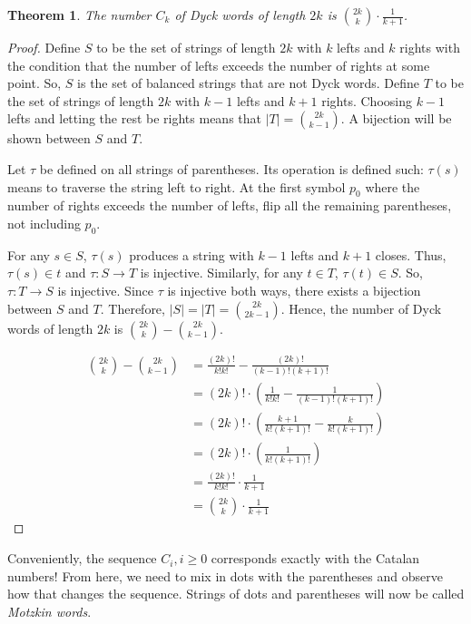 \documentclass[11pt]{amsart}
\theoremstyle{plain}%
\newtheorem{thm}{Theorem}[section]
\theoremstyle{definition}
\theoremstyle{remark}
\numberwithin{equation}{thm}
\begin{document}
\begin{thm}
    \label{DyckWords}
    The number $C_k$ of Dyck words of length $2k$ is $\binom{2k}{k}\cdot\frac{1}{k+1}$.
\end{thm}

\begin{proof}
    Define $S$ to be the set of strings of length $2k$ with $k$ lefts and $k$ rights with the condition that the number of lefts exceeds the number of rights at some point. So, $S$ is the set of balanced strings that are not Dyck words.
    Define $T$ to be the set of strings of length $2k$ with $k-1$ lefts and $k+1$ rights. Choosing $k-1$ lefts and letting the rest be rights means that $|T| = \binom{2k}{k-1}$. A bijection will be shown between $S$ and $T$.

    Let $\tau$ be defined on all strings of parentheses. Its operation is defined such: $\tau(s)$ means to traverse the string left to right. At the first symbol $p_0$ where the number of rights exceeds the number of lefts, flip all the remaining parentheses, not including $p_0$.

    For any $s \in S$, $\tau(s)$ produces a string with $k-1$ lefts and $k+1$ closes. Thus, $\tau(s) \in t$ and $\tau: S \rightarrow T$ is injective. Similarly, for any $t \in T$, $\tau(t) \in S$. So, $\tau: T \rightarrow S$ is injective. Since $\tau$ is injective both ways, there exists a bijection between $S$ and $T$. Therefore, $|S| = |T| = \binom{2k}{2k-1}$. Hence, the number of Dyck words of length $2k$ is $\binom{2k}{k} - \binom{2k}{k-1}.$

    \begin{align*}
        \binom{2k}{k} - \binom{2k}{k-1} &= \frac{(2k)!}{k!k!} - \frac{(2k)!}{(k-1)!(k+1)!}\\
        &= (2k)!\cdot\left(\frac{1}{k!k!} - \frac{1}{(k-1)!(k+1)!}\right)\\
        &= (2k)!\cdot\left(\frac{k+1}{k!(k+1)!} - \frac{k}{k!(k+1)!}\right)\\
        &= (2k)!\cdot\left(\frac{1}{k!(k+1)!}\right)\\
        &= \frac{(2k)!}{k!k!}\cdot\frac{1}{k+1}\\
        &= \binom{2k}{k}\cdot\frac{1}{k+1}
    \end{align*}
\end{proof}

Conveniently, the sequence ${C_i}, i \geq 0$ corresponds exactly with the Catalan numbers! From here, we need to mix in dots with the parentheses and observe how that changes the sequence. Strings of dots and parentheses will now be called \textit{Motzkin words}.
\end{document}
